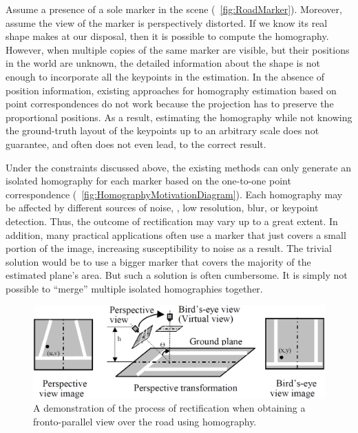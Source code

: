 Assume a presence of a sole marker in the scene (\figtext{}~\ref{fig:RoadMarker}). Moreover, assume the view of the marker is perspectively distorted. If we know its real shape makes at our disposal, then it is possible to compute the homography. However, when multiple copies of the same marker are visible, but their positions in the world are unknown, the detailed information about the shape is not enough to incorporate all the keypoints in the estimation. In the absence of position information, existing approaches for homography estimation based on point correspondences do not work because the projection has to preserve the proportional positions. As a result, estimating the homography while not knowing the ground-truth layout of the keypoints up to an arbitrary scale does not guarantee, and often does not even lead, to the correct result.

Under the constraints discussed above, the existing methods can only generate an isolated homography for each marker based on the one-to-one point correspondence (\figtext{}~\ref{fig:HomographyMotivationDiagram}). Each homography may be affected by different sources of noise, \egtext{}, low resolution, blur, or keypoint detection. Thus, the outcome of rectification may vary up to a great extent. In addition, many practical applications often use a marker that just covers a small portion of the image, increasing susceptibility to noise as a result. The trivial solution would be to use a bigger marker that covers the majority of the estimated plane's area. But such a solution is often cumbersome. It is simply not possible to ``merge'' multiple isolated homographies together.

\begin{figure}[t]
    \centerline{\includegraphics[width=0.8\linewidth]{figures/homography/road_rectification.png}}
    \caption[Road rectification]{A demonstration of the process of rectification when obtaining a fronto-parallel view over the road using homography. }
    \label{fig:RoadRectification}
\end{figure}

